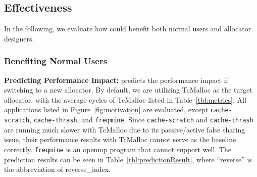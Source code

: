 \subsection{Effectiveness}
\label{sec:effectiveness}

In the following, we evaluate how \MP{} could benefit both normal users and allocator designers. 

\subsubsection{Benefiting Normal Users} 
\label{sec:normalusers}
\textbf{Predicting Performance Impact:} 
\MP{} predicts the performance impact if switching to a new allocator. By default, we are utilizing TcMalloc as the target allocator, with the average cycles of TcMalloc listed in Table~\ref{tbl:metrics}. All applications listed in Figure~\ref{fig:motivation} are evaluated, except \texttt{cache-scratch},  \texttt{cache-thrash}, and \texttt{freqmine}.  Since \texttt{cache-scratch} and \texttt{cache-thrash} are running much slower with TcMalloc due to its passive/active false sharing issue, their performance results with TcMalloc cannot serve as the baseline correctly. \texttt{freqmine} is an openmp program that \MP{} cannot support well. The prediction results can be seen in Table~\ref{tbl:predictionResult}, where ``reverse'' is the abbreviation of reverse\_index. 

